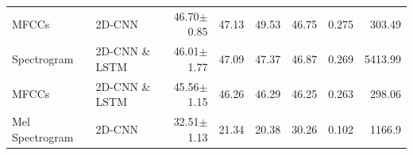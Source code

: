 \begin{table}[H]
{\begin{tabular}{llrrrrrr}
			MFCCs & 2D-CNN & 46.70$\pm$0.85 & 47.13 & 49.53 & 46.75 & 0.275 & 303.49 \\
			
			Spectrogram & 2D-CNN \& LSTM & 46.01$\pm$1.77 & 47.09 & 47.37 & 46.87 & 0.269 & 5413.99 \\
			
			MFCCs & 2D-CNN \& LSTM & 45.56$\pm$1.15 & 46.26 & 46.29 & 46.25 & 0.263 & 298.06 \\
			
			Mel Spectrogram & 2D-CNN & 32.51$\pm$1.13 & 21.34 & 20.38 & 30.26 & 0.102 & 1166.9 \\		
			
			
			\bottomrule
		\end{tabular}%
	}
\end{table}
